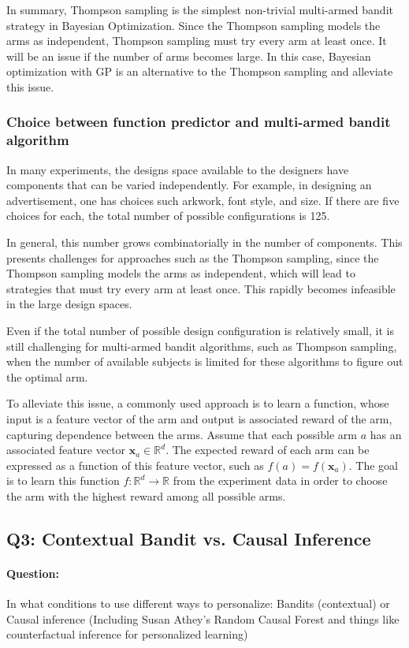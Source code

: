 \documentclass{article}
\begin{document}
In summary, Thompson sampling is the simplest non-trivial multi-armed
bandit strategy in Bayesian Optimization. Since the Thompson sampling
models the arms as independent, Thompson sampling must try every arm
at least once. It will be an issue if the number of arms becomes
large. In this case, Bayesian optimization with GP is an alternative
to the Thompson sampling and alleviate this issue.

\subsubsection{Choice between function predictor and multi-armed bandit algorithm}
In many experiments, the designs space available to the designers have
components that can be varied independently. For example, in designing
an advertisement, one has choices such arkwork, font style, and
size. If there are five choices for each, the total number of possible
configurations is 125.

In general, this number grows combinatorially in the number of
components. This presents challenges for approaches such as the Thompson sampling, since the Thompson sampling models the arms as independent, which will lead
to strategies that must try every arm at least once. This rapidly
becomes infeasible in the large design spaces.

Even if the total number of possible design configuration is
relatively small, it is still challenging for multi-armed bandit
algorithms, such as Thompson sampling, when the number of available subjects is limited for these
algorithms to figure out the optimal arm.

To alleviate this issue, a commonly used approach is to learn a
function, whose input is a feature vector of the arm and output is
associated reward of the arm, capturing dependence between the arms. Assume that each possible arm $a$ has an
associated feature vector $\mathbf{x}_a\in \mathbb{R}^d$. The expected
reward of each arm can be expressed as a function of this feature
vector, such as $f(a) = f(\mathbf{x}_a)$. The goal is to learn this
function $f:\mathbb{R}^d \rightarrow \mathbb{R}$ from the experiment
data in order to choose the arm with the highest reward among all
possible arms.

\subsection{Q3: Contextual Bandit vs. Causal Inference}
\paragraph{Question:} In what conditions to use different ways to
personalize: Bandits (contextual) or Causal inference (Including Susan
Athey's Random Causal Forest and things like counterfactual inference
for personalized learning) \\ [0.1 in]
\end{document}

